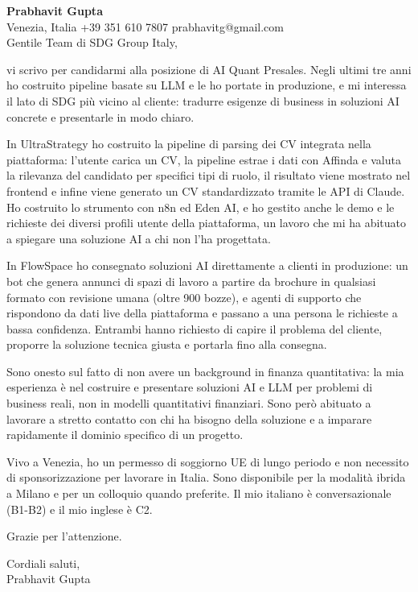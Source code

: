 \documentclass[a4paper,10.5pt]{article}
\begin{document}
\textbf{Prabhavit Gupta}\\
Venezia, Italia \textbar{} +39 351 610 7807 \textbar{} prabhavitg@gmail.com\\[10pt]
Gentile Team di SDG Group Italy,

vi scrivo per candidarmi alla posizione di AI Quant Presales. Negli ultimi tre anni ho costruito pipeline basate su LLM e le ho portate in produzione, e mi interessa il lato di SDG più vicino al cliente: tradurre esigenze di business in soluzioni AI concrete e presentarle in modo chiaro.

In UltraStrategy ho costruito la pipeline di parsing dei CV integrata nella piattaforma: l'utente carica un CV, la pipeline estrae i dati con Affinda e valuta la rilevanza del candidato per specifici tipi di ruolo, il risultato viene mostrato nel frontend e infine viene generato un CV standardizzato tramite le API di Claude. Ho costruito lo strumento con n8n ed Eden AI, e ho gestito anche le demo e le richieste dei diversi profili utente della piattaforma, un lavoro che mi ha abituato a spiegare una soluzione AI a chi non l'ha progettata.

In FlowSpace ho consegnato soluzioni AI direttamente a clienti in produzione: un bot che genera annunci di spazi di lavoro a partire da brochure in qualsiasi formato con revisione umana (oltre 900 bozze), e agenti di supporto che rispondono da dati live della piattaforma e passano a una persona le richieste a bassa confidenza. Entrambi hanno richiesto di capire il problema del cliente, proporre la soluzione tecnica giusta e portarla fino alla consegna.

Sono onesto sul fatto di non avere un background in finanza quantitativa: la mia esperienza è nel costruire e presentare soluzioni AI e LLM per problemi di business reali, non in modelli quantitativi finanziari. Sono però abituato a lavorare a stretto contatto con chi ha bisogno della soluzione e a imparare rapidamente il dominio specifico di un progetto.

Vivo a Venezia, ho un permesso di soggiorno UE di lungo periodo e non necessito di sponsorizzazione per lavorare in Italia. Sono disponibile per la modalità ibrida a Milano e per un colloquio quando preferite. Il mio italiano è conversazionale (B1-B2) e il mio inglese è C2.

Grazie per l'attenzione.

Cordiali saluti,\\
Prabhavit Gupta
\end{document}
